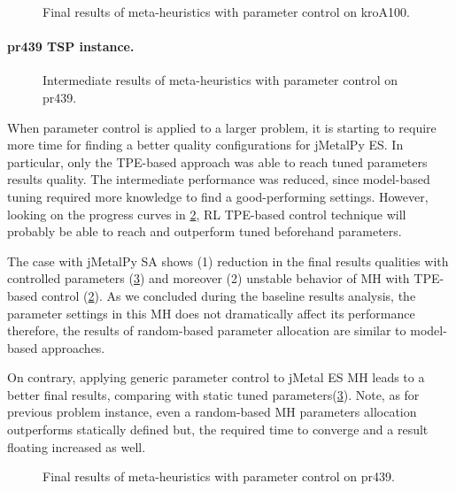 
\begin{figure}[b]
	\centering
	
	\caption{Final results of meta-heuristics with parameter control on kroA100.}
	\label{eval:pict:pc:kroA100 final}
\end{figure}

\newpage
\paragraph{pr439 TSP instance.}
\begin{figure}[t]
	\centering
	
	\caption{Intermediate results of meta-heuristics with parameter control on pr439.}
	\label{eval:pict:pc:pr439 intermediate}
\end{figure}

When parameter control is applied to a larger problem, it is starting to require more time for finding a better quality configurations for jMetalPy ES. In particular, only the TPE-based approach was able to reach tuned parameters results quality. The intermediate performance was reduced, since model-based tuning required more knowledge to find a good-performing settings. However, looking on the progress curves in \cref{eval:pict:pc:pr439 intermediate}, RL TPE-based control technique will probably be able to reach and outperform tuned beforehand parameters.

The case with jMetalPy SA shows (1) reduction in the final results qualities with controlled parameters (\cref{eval:pict:pc:pr439 final}) and moreover (2) unstable behavior of MH with TPE-based control (\cref{eval:pict:pc:pr439 intermediate}). As we concluded during the baseline results analysis, the parameter settings in this MH does not dramatically affect its performance therefore, the results of random-based parameter allocation are similar to model-based approaches.

On contrary, applying generic parameter control to jMetal ES MH leads to a better final results, comparing with static tuned parameters(\cref{eval:pict:pc:pr439 final}). Note, as for previous problem instance, even a random-based MH parameters allocation outperforms statically defined but, the required time to converge and a result floating increased as well. 
\begin{figure}[b]
	\centering
	
	\caption{Final results of meta-heuristics with parameter control on pr439.}
	\label{eval:pict:pc:pr439 final}
\end{figure}

